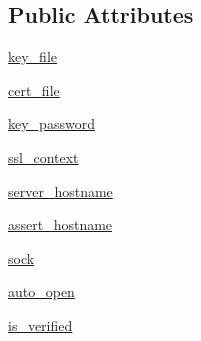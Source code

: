 \subsection*{Public Attributes}
\begin{DoxyCompactItemize}
\item 
\hyperlink{classpip_1_1__vendor_1_1urllib3_1_1connection_1_1HTTPSConnection_a9af1fee7e3b50b908a1ae9a4f8ff2d85}{key\+\_\+file}
\item 
\hyperlink{classpip_1_1__vendor_1_1urllib3_1_1connection_1_1HTTPSConnection_a880373ccac07a1b3daa221aeea0f06c7}{cert\+\_\+file}
\item 
\hyperlink{classpip_1_1__vendor_1_1urllib3_1_1connection_1_1HTTPSConnection_adc9b3bade82171d24b077955e509410d}{key\+\_\+password}
\item 
\hyperlink{classpip_1_1__vendor_1_1urllib3_1_1connection_1_1HTTPSConnection_abd7765dd26b55def9da94e0cdb56bb22}{ssl\+\_\+context}
\item 
\hyperlink{classpip_1_1__vendor_1_1urllib3_1_1connection_1_1HTTPSConnection_ab8db450d5bfd1899730b58deb04dfc7e}{server\+\_\+hostname}
\item 
\hyperlink{classpip_1_1__vendor_1_1urllib3_1_1connection_1_1HTTPSConnection_a7917c609d8a6de49725ca33ac4b00330}{assert\+\_\+hostname}
\item 
\hyperlink{classpip_1_1__vendor_1_1urllib3_1_1connection_1_1HTTPSConnection_ad7d610b1dc34f1ff32506e29fc5febb7}{sock}
\item 
\hyperlink{classpip_1_1__vendor_1_1urllib3_1_1connection_1_1HTTPSConnection_a26a5e2788ef87368a28d584ff1fb4faf}{auto\+\_\+open}
\item 
\hyperlink{classpip_1_1__vendor_1_1urllib3_1_1connection_1_1HTTPSConnection_a3ef44948621b96ee483e02f95794ed69}{is\+\_\+verified}
\end{DoxyCompactItemize}
